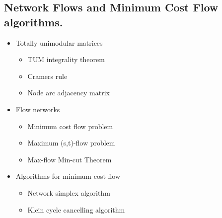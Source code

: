 \documentclass[11pt]{article}
\begin{document}
\subsection{Network Flows and Minimum Cost Flow algorithms.}
\label{sec:orgef9c5ed}
\begin{itemize}
\item Totally unimodular matrices
\begin{itemize}
\item TUM integrality theorem
\item Cramers rule
\item Node arc adjacency matrix
\end{itemize}

\item Flow networks
\begin{itemize}
\item Minimum cost flow problem
\item Maximum (s,t)-flow problem
\item Max-flow Min-cut Theorem
\end{itemize}

\item Algorithms for minimum cost flow
\begin{itemize}
\item Network simplex algorithm
\item Klein cycle cancelling algorithm
\end{itemize}
\end{itemize}
\end{document}
